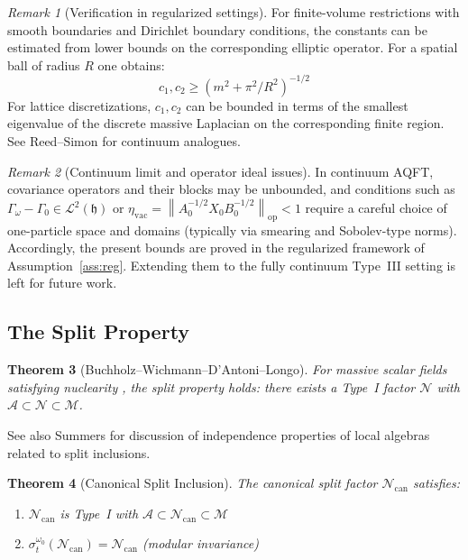 \documentclass[11pt,a4paper]{article}
\theoremstyle{plain}
\newtheorem{theorem}{Theorem}[section]
\theoremstyle{definition}
\theoremstyle{remark}
\newtheorem{remark}[theorem]{Remark}
\newcommand{\Aa}{\mathcal{A}}
\newcommand{\Nn}{\mathcal{N}}
\newcommand{\Mm}{\mathcal{M}}
\newcommand{\hh}{\mathfrak{h}}
\newcommand{\opnorm}[1]{\left\lVert #1 \right\rVert_{\mathrm{op}}}
\newcommand{\etavac}{\eta_{\mathrm{vac}}}
\newcommand{\Ncan}{\Nn_{\mathrm{can}}}
\begin{document}
\begin{remark}[Verification in regularized settings]
For finite-volume restrictions with smooth boundaries and Dirichlet boundary
conditions, the constants can be estimated from lower bounds on the corresponding
elliptic operator. For a spatial ball of radius $R$ one obtains:
\begin{equation}
c_1, c_2 \ge (m^2 + \pi^2/R^2)^{-1/2}
\end{equation}
For lattice discretizations, $c_1, c_2$ can be bounded in terms of the smallest
eigenvalue of the discrete massive Laplacian on the corresponding finite region. See
Reed--Simon \cite[Theorem~XIII.67]{ReedSimon78} for continuum analogues.
\end{remark}

\begin{remark}[Continuum limit and operator ideal issues]
In continuum AQFT, covariance operators and their blocks may be unbounded, and
conditions such as $\Gamma_\omega - \Gamma_0 \in \mathcal{L}^2(\hh)$ or
$\etavac = \opnorm{A_0^{-1/2} X_0 B_0^{-1/2}} < 1$ require a careful choice of
one-particle space and domains (typically via smearing and Sobolev-type norms).
Accordingly, the present bounds are proved in the regularized framework of
Assumption~\ref{ass:reg}. Extending them to the fully continuum Type~III setting is
left for future work.
\end{remark}

\subsection{The Split Property}

\begin{theorem}[Buchholz--Wichmann--D'Antoni--Longo]
For massive scalar fields satisfying nuclearity \cite{BW86}, the split property
holds: there exists a Type~I factor $\Nn$ with $\Aa \subset \Nn \subset \Mm$.
\end{theorem}

See also Summers \cite{Summers90} for discussion of independence properties of local
algebras related to split inclusions.

\begin{theorem}[Canonical Split Inclusion]\label{thm:canonical}
The canonical split factor $\Ncan$ satisfies:
\begin{enumerate}
\item[(a)] $\Ncan$ is Type~I with $\Aa \subset \Ncan \subset \Mm$
\item[(b)] $\sigma_t^{\omega_0}(\Ncan) = \Ncan$ (modular invariance)
\end{enumerate}
\end{theorem}
\end{document}
